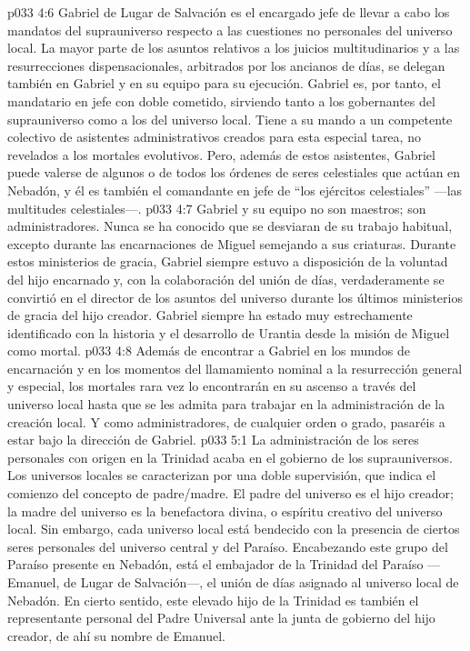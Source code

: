 \vs p033 4:6 Gabriel de Lugar de Salvación es el encargado jefe de llevar a cabo los mandatos del suprauniverso respecto a las cuestiones no personales del universo local. La mayor parte de los asuntos relativos a los juicios multitudinarios y a las resurrecciones dispensacionales, arbitrados por los ancianos de días, se delegan también en Gabriel y en su equipo para su ejecución. Gabriel es, por tanto, el mandatario en jefe con doble cometido, sirviendo tanto a los gobernantes del suprauniverso como a los del universo local. Tiene a su mando a un competente colectivo de asistentes administrativos creados para esta especial tarea, no revelados a los mortales evolutivos. Pero, además de estos asistentes, Gabriel puede valerse de algunos o de todos los órdenes de seres celestiales que actúan en Nebadón, y él es también el comandante en jefe de “los ejércitos celestiales” ---las multitudes celestiales---.
\vs p033 4:7 \pc Gabriel y su equipo no son maestros; son administradores. Nunca se ha conocido que se desviaran de su trabajo habitual, excepto durante las encarnaciones de Miguel semejando a sus criaturas. Durante estos ministerios de gracia, Gabriel siempre estuvo a disposición de la voluntad del hijo encarnado y, con la colaboración del unión de días, verdaderamente se convirtió en el director de los asuntos del universo durante los últimos ministerios de gracia del hijo creador. Gabriel siempre ha estado muy estrechamente identificado con la historia y el desarrollo de Urantia desde la misión de Miguel como mortal.
\vs p033 4:8 Además de encontrar a Gabriel en los mundos de encarnación y en los momentos del llamamiento nominal a la resurrección general y especial, los mortales rara vez lo encontrarán en su ascenso a través del universo local hasta que se les admita para trabajar en la administración de la creación local. Y como administradores, de cualquier orden o grado, pasaréis a estar bajo la dirección de Gabriel.
\vs p033 5:1 La administración de los seres personales con origen en la Trinidad acaba en el gobierno de los suprauniversos. Los universos locales se caracterizan por una doble supervisión, que indica el comienzo del concepto de padre/madre. El padre del universo es el hijo creador; la madre del universo es la benefactora divina, o espíritu creativo del universo local. Sin embargo, cada universo local está bendecido con la presencia de ciertos seres personales del universo central y del Paraíso. Encabezando este grupo del Paraíso presente en Nebadón, está el embajador de la Trinidad del Paraíso ---Emanuel, de Lugar de Salvación---, el unión de días asignado al universo local de Nebadón. En cierto sentido, este elevado hijo de la Trinidad es también el representante personal del Padre Universal ante la junta de gobierno del hijo creador, de ahí su nombre de Emanuel.
